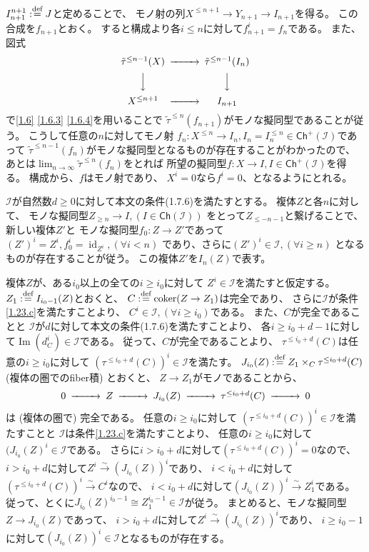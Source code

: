 \documentclass[uplatex,dvipdfmx]{jsarticle}
\makeatletter
\theoremstyle{definition}
\renewenvironment{proof}[1][\proofname]{
  \pushQED{\qed}%
  \normalfont \topsep6\p@\@plus6\p@\relax
  \trivlist
  \item[\hskip\labelsep
    #1\@addpunct{\textbf{.}}]\ignorespaces
}{%
  \popQED\endtrivlist\@endpefalse
}
\providecommand{\proofname}{証明}
\DeclareMathOperator{\id}{\mathrm{id}}
\DeclareMathOperator{\im}{\mathrm{Im}}
\DeclareMathOperator{\coker}{\mathrm{coker}}
\newcommand{\Ch}{\mathsf{Ch}}
\newcommand\mcI{\mathcal{I}}
\def\dfn{:\overset{\mbox{{\scriptsize def}}}{=}}
\makeatother
\begin{document}
\begin{proof}
  \(I_{n+1}^{n+1} \dfn J\)と定めることで、
  モノ射の列\(X^{\leq n+1}\to Y_{n+1} \to I_{n+1}\)を得る。
  この合成を\(f_{n+1}\)とおく。
  すると構成より各\(i\leq n\)に対して\(f_{n+1}^i = f_n\)である。
  また、図式
  \[
  \begin{CD}
    \tilde{\tau}^{\leq n-1}(X) @>>> \tilde{\tau}^{\leq n-1}(I_n) \\
    @VVV @VVV \\
    X^{\leq n+1} @>>> I_{n+1}
  \end{CD}
  \]
  で\autoref{1.6} \ref{1.6.3} \ref{1.6.4}を用いることで
  \(\tilde{\tau}^{\leq n}(f_{n+1})\)がモノな擬同型であることが従う。
  こうして任意の\(n\)に対してモノ射
  \(f_n:X^{\leq n}\to I_n, I_n=I_n^{\leq n} \in \Ch^+(\mcI)\)であって
  \(\tilde{\tau}^{\leq n-1}(f_n)\)がモノな擬同型となるものが存在することがわかったので、
  あとは\(\lim_{n\to \infty}\tilde{\tau}^{\leq n}(f_n)\)をとれば
  所望の擬同型\(f:X\to I, I\in \Ch^+(\mcI)\)を得る。
  構成から、\(f\)はモノ射であり、
  \(X^i = 0\)なら\(f^i = 0\)、となるようにとれる。

  \(\mcI\)が自然数\(d\geq 0\)に対して本文の条件(1.7.6)を満たすとする。
  複体\(Z\)と各\(n\)に対して、
  モノな擬同型\(Z_{\geq n}\to I, (I\in \Ch(\mcI))\)
  をとって\(Z_{\leq -n-1}\)と繋げることで、
  新しい複体\(Z'\)と
  モノな擬同型\(f_0:Z\to Z'\)であって
  \((Z')^i=Z^i,f_0^i = \id_{Z^i},(\forall i < n)\)
  であり、さらに\((Z')^i\in \mcI, (\forall i \geq n)\)
  となるものが存在することが従う。
  この複体\(Z'\)を\(I_n(Z)\)で表す。

  複体\(Z\)が、ある\(i_0\)以上の全ての\(i\geq i_0\)に対して
  \(Z^i\in \mcI\)を満たすと仮定する。
  \(Z_1 \dfn I_{i_0-1}(Z)\)とおくと、
  \(C\dfn \coker(Z\to Z_1)\)は完全であり、
  さらに\(\mcI\)が条件\ref{1.23.c}を満たすことより、
  \(C^i\in \mcI,(\forall i \geq i_0)\)である。
  また、\(C\)が完全であることと
  \(\mcI\)が\(d\)に対して本文の条件(1.7.6)を満たすことより、
  各\(i \geq i_0+d-1\)に対して\(\im(d_C^i) \in \mcI\)である。
  従って、\(C\)が完全であることより、
  \(\tau^{\leq i_0+d}(C)\)は任意の\(i \geq i_0\)に対して
  \((\tau^{\leq i_0+d}(C))^i\in \mcI\)を満たす。
  \(J_{i_0}(Z)\dfn Z_1\times_C\tau^{\leq i_0+d}(C)\)
  (複体の圏でのfiber積) とおくと、
  \(Z\to Z_1\)がモノであることから、
  \[
  \begin{CD}
    0 @>>> Z @>>> J_{i_0}(Z) @>>> \tau^{\leq i_0+d}(C) @>>> 0
  \end{CD}
  \]
  は (複体の圏で) 完全である。
  任意の\(i \geq i_0\)に対して
  \((\tau^{\leq i_0+d}(C))^i\in \mcI\)を満たすことと
  \(\mcI\)は条件\ref{1.23.c}を満たすことより、
  任意の\(i\geq i_0\)に対して\((J_{i_0}(Z)^i\in \mcI\)である。
  さらに\(i > i_0+d\)に対して\((\tau^{\leq i_0+d}(C))^i=0\)なので、
  \(i > i_0+d\)に対して\(Z^i\xrightarrow{\sim}(J_{i_0}(Z))^i\)であり、
  \(i < i_0+d\)に対して\((\tau^{\leq i_0+d}(C))^i\xrightarrow{\sim}C^i\)なので、
  \(i < i_0+d\)に対して\((J_{i_0}(Z))^i\xrightarrow{\sim}Z_1^i\)である。
  従って、とくに\(J_{i_0}(Z)^{i_0-1}\cong Z_1^{i_0-1}\in \mcI\)が従う。
  まとめると、モノな擬同型\(Z\to J_{i_0}(Z)\)であって、
  \(i > i_0+d\)に対して\(Z^i\xrightarrow{\sim}(J_{i_0}(Z))^i\)であり、
  \(i \geq i_0-1\)に対して\((J_{i_0}(Z))^i \in \mcI\)となるものが存在する。


\end{proof}
\end{document}
